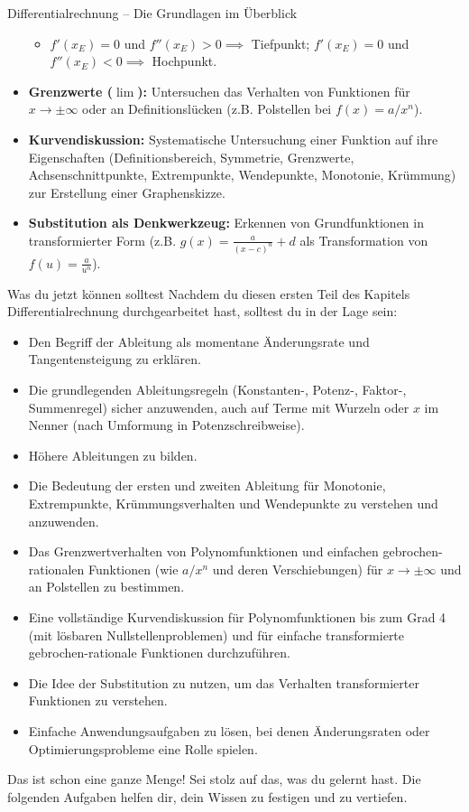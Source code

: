 \begin{kurzknappumgebung}{Differentialrechnung – Die Grundlagen im Überblick}
\begin{itemize}
\begin{itemize}
            \item $f'(x_E)=0$ und $f''(x_E) > 0 \implies$ Tiefpunkt; $f'(x_E)=0$ und $f''(x_E) < 0 \implies$ Hochpunkt.
        \end{itemize}
    \item \textbf{Grenzwerte ($\lim$):} Untersuchen das Verhalten von Funktionen für $x \to \pm\infty$ oder an Definitionslücken (z.B. Polstellen bei $f(x)=a/x^n$).
    \item \textbf{Kurvendiskussion:} Systematische Untersuchung einer Funktion auf ihre Eigenschaften (Definitionsbereich, Symmetrie, Grenzwerte, Achsenschnittpunkte, Extrempunkte, Wendepunkte, Monotonie, Krümmung) zur Erstellung einer Graphenskizze.
    \item \textbf{Substitution als Denkwerkzeug:} Erkennen von Grundfunktionen in transformierter Form (z.B. $g(x) = \frac{a}{(x-c)^n}+d$ als Transformation von $f(u)=\frac{a}{u^n}$).
\end{itemize}
\end{kurzknappumgebung}

\begin{warumwichtigumgebung}{Was du jetzt können solltest}
Nachdem du diesen ersten Teil des Kapitels Differentialrechnung durchgearbeitet hast, solltest du in der Lage sein:
\begin{itemize}
    \item Den Begriff der Ableitung als momentane Änderungsrate und Tangentensteigung zu erklären.
    \item Die grundlegenden Ableitungsregeln (Konstanten-, Potenz-, Faktor-, Summenregel) sicher anzuwenden, auch auf Terme mit Wurzeln oder $x$ im Nenner (nach Umformung in Potenzschreibweise).
    \item Höhere Ableitungen zu bilden.
    \item Die Bedeutung der ersten und zweiten Ableitung für Monotonie, Extrempunkte, Krümmungsverhalten und Wendepunkte zu verstehen und anzuwenden.
    \item Das Grenzwertverhalten von Polynomfunktionen und einfachen gebrochen-rationalen Funktionen (wie $a/x^n$ und deren Verschiebungen) für $x \to \pm\infty$ und an Polstellen zu bestimmen.
    \item Eine vollständige Kurvendiskussion für Polynomfunktionen bis zum Grad 4 (mit lösbaren Nullstellenproblemen) und für einfache transformierte gebrochen-rationale Funktionen durchzuführen.
    \item Die Idee der Substitution zu nutzen, um das Verhalten transformierter Funktionen zu verstehen.
    \item Einfache Anwendungsaufgaben zu lösen, bei denen Änderungsraten oder Optimierungsprobleme eine Rolle spielen.
\end{itemize}
Das ist schon eine ganze Menge! Sei stolz auf das, was du gelernt hast. Die folgenden Aufgaben helfen dir, dein Wissen zu festigen und zu vertiefen.
\end{warumwichtigumgebung}

